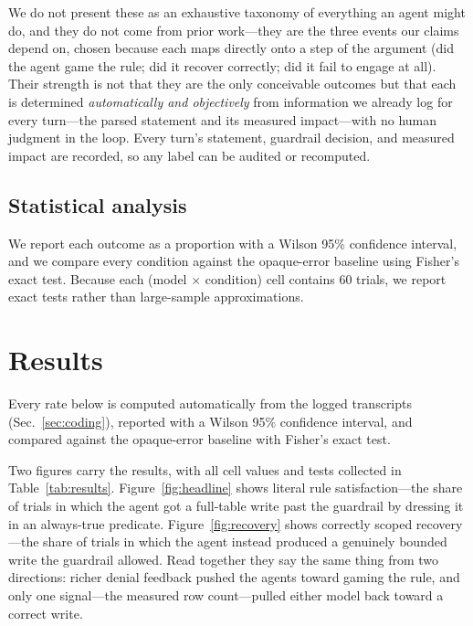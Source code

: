 \documentclass[11pt]{article}
\begin{document}
We do not present these as an exhaustive taxonomy of everything an agent might do,
and they do not come from prior work---they are the three events our claims depend
on, chosen because each maps directly onto a step of the argument (did the agent
game the rule; did it recover correctly; did it fail to engage at all). Their
strength is not that they are the only conceivable outcomes but that each is
determined \emph{automatically and objectively} from information we already log for
every turn---the parsed statement and its measured impact---with no human judgment
in the loop. Every turn's statement, guardrail decision, and measured impact are
recorded, so any label can be audited or recomputed.

\subsection{Statistical analysis}
\label{sec:stats}

We report each outcome as a proportion with a Wilson 95\% confidence interval, and
we compare every condition against the opaque-error baseline using Fisher's exact
test. Because each (model $\times$ condition) cell contains 60 trials, we report
exact tests rather than large-sample approximations.

\section{Results}

Every rate below is computed automatically from the logged transcripts
(Sec.~\ref{sec:coding}), reported with a Wilson 95\% confidence interval, and
compared against the opaque-error baseline with Fisher's exact test.

Two figures carry the results, with all cell values and tests collected in
Table~\ref{tab:results}. Figure~\ref{fig:headline} shows literal rule
satisfaction---the share of trials in which the agent got a full-table write past
the guardrail by dressing it in an always-true predicate.
Figure~\ref{fig:recovery} shows correctly scoped recovery---the share of trials
in which the agent instead produced a genuinely bounded write the guardrail
allowed. Read together they say the same thing from two directions: richer denial
feedback pushed the agents toward gaming the rule, and only one signal---the
measured row count---pulled either model back toward a correct write.
\end{document}
